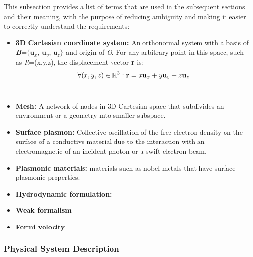 \documentclass[12pt]{article}
\begin{document}
This subsection provides a list of terms that are used in the subsequent
sections and their meaning, with the purpose of reducing ambiguity and making it
easier to correctly understand the requirements:

\begin{itemize} 
\item \textbf{3D Cartesian coordinate system:} An orthonormal system with a basis of \textbf{\textit{B}}=$\{$$\textbf{u}_x$, $\textbf{u}_y$, $\textbf{u}_z$$\}$ and origin of \textit{O}. For any arbitrary point in this space, such as \textit{R}=(x,y,z), the displacement vector \textbf{r} is: \\

\begin{equation}
	\label{eq:planewave}
	\forall (x, y, z) \in \Bbb R^3: \textbf{r}= x\textbf{u}_x + y\textbf{u}_y +z\textbf{u}_z
	\end{equation} \\

\item \textbf{Mesh:} A network of nodes in 3D Cartesian space that subdivides an environment or a geometry into smaller subspace.   
\item \textbf{Surface plasmon:} Collective oscillation of the free electron density on the surface of a conductive material due to the interaction with an electromagnetic of an incident photon or a swift electron beam.     
\item \textbf{Plasmonic materials:} materials such as nobel metals that have surface plasmonic properties.

\item \textbf{Hydrodynamic formulation:}

\item \textbf{Weak formalism} 

\item \textbf{Fermi velocity}
\end{itemize}


\subsubsection{Physical System Description} \label{sec_phySystDescrip}

\end{document}
